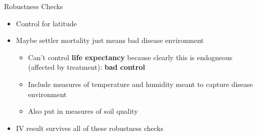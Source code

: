 \documentclass[dvipsnames,hyperref={pdfpagelabels=false}]{beamer}
\begin{document}
\begin{frame}{Robustness Checks}
	\begin{itemize}
		\item Control for latitude
		\vspace{0.2cm}
		\item Maybe settler mortality just means bad disease environment
		\vspace{0.2cm}
		\begin{itemize}
			\item Can't control \textbf{life expectancy} because clearly this is endogneous (affected by treatment): \textbf{bad control}
			\vspace{0.2cm}
			\item Include measures of temperature and humidity meant to capture disease environment
			\vspace{0.2cm}
			\item Also put in measures of soil quality
		\end{itemize}
		\vspace{0.2cm}
		\item IV result survives all of these robustness checks
		
	\end{itemize}
\end{frame}
\end{document}
